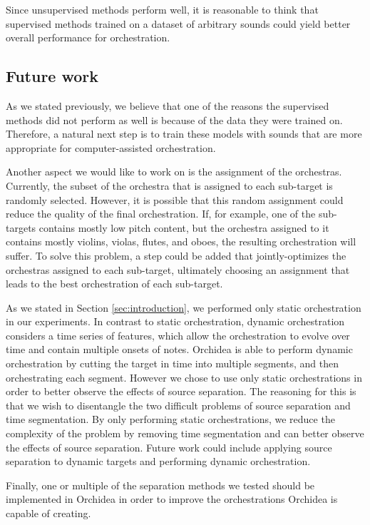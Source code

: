 \documentclass{article}
\begin{document}
  Since unsupervised methods perform well, it is reasonable to think that supervised methods trained on a dataset of arbitrary sounds could yield better overall performance for orchestration.
  
    \subsection{Future work}\label{sec:futurework}  
    As we stated previously, we believe that one of the reasons the supervised methods did not perform as well is because of the data they were trained on. Therefore, a natural next step is to train these models with sounds that are more appropriate for computer-assisted orchestration.
    
    Another aspect we would like to work on is the assignment of the orchestras. Currently, the subset of the orchestra that is assigned to each sub-target is randomly selected. However, it is possible that this random assignment could reduce the quality of the final orchestration. If, for example, one of the sub-targets contains mostly low pitch content, but the orchestra assigned to it contains mostly violins, violas, flutes, and oboes, the resulting orchestration will suffer. To solve this problem, a step could be added that jointly-optimizes the orchestras assigned to each sub-target, ultimately choosing an assignment that leads to the best orchestration of each sub-target.
    
    As we stated in Section \ref{sec:introduction}, we performed only static orchestration in our experiments. In contrast to static orchestration, dynamic orchestration considers a time series of features, which allow the orchestration to evolve over time and contain multiple onsets of notes. Orchidea is able to perform dynamic orchestration by cutting the target in time into multiple segments, and then orchestrating each segment. However we chose to use only static orchestrations in order to better observe the effects of source separation. The reasoning for this is that we wish to disentangle the two difficult problems of source separation and time segmentation. By only performing static orchestrations, we reduce the complexity of the problem by removing time segmentation and can better observe the effects of source separation. Future work could include applying source separation to dynamic targets and performing dynamic orchestration.
    
    Finally, one or multiple of the separation methods we tested should be implemented in Orchidea in order to improve the orchestrations Orchidea is capable of creating. 



\end{document}
